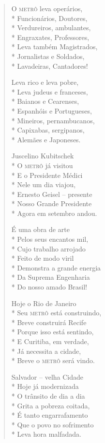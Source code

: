 \begin{verse}
O \textsc{metrô} leva operários,\\*
Funcionários, Doutores,\\*
Verdureiros, ambulantes,\\*
Engraxates, Professores,\\*
Leva também Magistrados,\\*
Jornalistas e Soldados,\\*
Lavadeiras, Cantadores!

Leva rico e leva pobre,\\*
Leva judeus e franceses,\\*
Baianos e Cearenses,\\*
Espanhóis e Portugueses,\\*
Mineiros, pernambucanos,\\*
Capixabas, sergipanos,\\*
Alemães e Japoneses.

Juscelino Kubitschek\\*
O \textsc{metrô} já visitou\\*
E o Presidente Médici\\*
Nele um dia viajou,\\*
Ernesto Geisel --  presente\\*
Nosso Grande Presidente\\*
Agora em setembro andou.

É uma obra de arte\\*
Pelos seus encantos mil,\\*
Cujo trabalho arrojado\\*
Feito de modo viril\\*
Demonstra a grande energia\\*
Da Suprema Engenharia\\*
Do nosso amado Brasil!

Hoje o Rio de Janeiro\\*
Seu \textsc{metrô} está construindo,\\*
Breve construirá Recife\\*
Porque isso está sentindo,\\*
E Curitiba, em verdade,\\*
Já necessita a cidade,\\*
Breve o \textsc{metrô} será vindo.

Salvador --  velha Cidade\\*
Hoje já modernizada\\*
O trânsito de dia a dia\\*
Grita a pobreza coitada,\\*
É tanto engarrafamento\\*
Que o povo no sofrimento\\*
Leva hora malfadada.


\end{verse}
